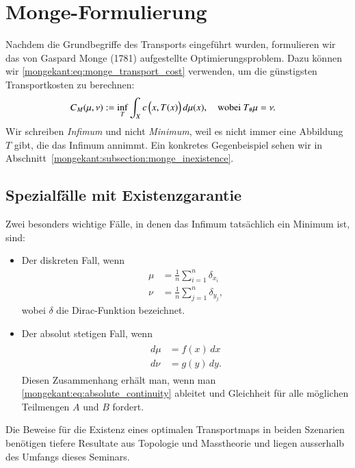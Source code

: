 %
%
%
%
\section{Monge-Formulierung%
\label{mongekant:section:teil1}}

Nachdem die Grundbegriffe des Transports eingeführt wurden,
formulieren wir das von Gaspard Monge (1781) aufgestellte Optimierungsproblem.
Dazu können wir \eqref{mongekant:eq:monge_transport_cost} verwenden,
um die günstigsten Transportkosten zu berechnen:
\begin{align}
C_M(\mu, \nu)
&:=
\inf_{T}
\int_X c\,\Bigl(x, T(x)\Bigr)\, d\mu(x)
,\quad
\text{wobei } T_{\#}\mu=\nu
.
\label{mongekant:eq:monge_problem}
\end{align}
Wir schreiben \emph{Infimum} und nicht \emph{Minimum},
weil es nicht immer eine Abbildung $T$ gibt,
die das Infimum annimmt.
Ein konkretes Gegenbeispiel sehen wir in
Abschnitt~\ref{mongekant:subsection:monge_inexistence}.

\subsection{Spezialfälle mit Existenzgarantie}
Zwei besonders wichtige Fälle,
in denen das Infimum tatsächlich ein Minimum ist,
sind:
\begin{itemize}
\item Der diskreten Fall, wenn
\begin{align*}
\mu
&=
\frac{1}{n} \sum_{i=1}^n \delta_{x_i}
\\
\nu
&=
\frac{1}{n} \sum_{j=1}^n \delta_{y_j}
,
\end{align*}
wobei $\delta$ die Dirac-Funktion bezeichnet.
\item Der absolut stetigen Fall, wenn
\begin{align}
\begin{aligned}
d\mu
&=
f(x)\, dx
\\
d\nu
&=
g(y)\, dy
.
\end{aligned}
\label{mongekant:eq:absolute_densities}
\end{align}
Diesen Zusammenhang erhält man,
wenn man \eqref{mongekant:eq:absolute_continuity} ableitet und
Gleichheit für alle möglichen Teilmengen $A$ und $B$ fordert.
\end{itemize}
Die Beweise für die Existenz eines optimalen Transportmaps in beiden Szenarien
benötigen tiefere Resultate aus Topologie und Masstheorie und
liegen ausserhalb des Umfangs dieses Seminars.

